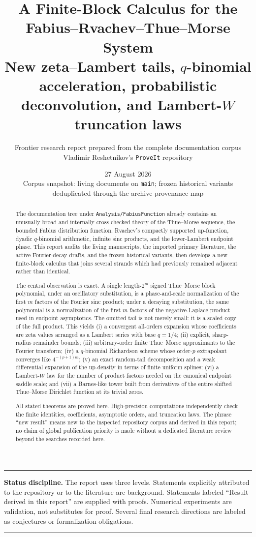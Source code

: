 \documentclass[11pt,oneside]{article}
\title{\bfseries A Finite-Block Calculus for the\\ Fabius--Rvachev--Thue--Morse System\\[0.4em]
\large New zeta--Lambert tails, $q$-binomial acceleration, probabilistic deconvolution, and Lambert-$W$ truncation laws}
\author{Frontier research report prepared from the complete documentation corpus\\
\small Vladimir Reshetnikov's \texttt{ProveIt} repository}
\date{27 August 2026\\
\small Corpus snapshot: living documents on \texttt{main}; frozen historical variants deduplicated through the archive provenance map}
\numberwithin{equation}{section}
\theoremstyle{definition}
\theoremstyle{remark}
\newcommand{\repo}{\nolinkurl{Analysis/FabiusFunction}}
\newenvironment{boxedremark}{%
  \par\smallskip\noindent\begin{center}\begin{minipage}{0.94\textwidth}%
  \color{black}\hrule\vspace{0.6em}\small
}{%
  \vspace{0.6em}\hrule\end{minipage}\end{center}\smallskip
}
\begin{document}
\maketitle

\begin{abstract}
The documentation tree under \repo{} already contains an unusually broad and internally
cross-checked theory of the Thue--Morse sequence, the bounded Fabius distribution function,
Rvachev's compactly supported up-function, dyadic $q$-binomial arithmetic, infinite sinc
products, and the lower-Lambert endpoint phase.  This report audits the living manuscripts,
the imported primary literature, the active Fourier-decay drafts, and the frozen historical
variants, then develops a new finite-block calculus that joins several strands which had
previously remained adjacent rather than identical.

The central observation is exact.  A single length-$2^m$ signed Thue--Morse block polynomial,
under an oscillatory substitution, is a phase-and-scale normalization of the first $m$ factors
of the Fourier sinc product; under a decaying substitution, the same polynomial is a
normalization of the first $m$ factors of the negative-Laplace product used in endpoint
asymptotics.  The omitted tail is not merely small: it is a scaled copy of the full product.
This yields (i) a convergent all-orders expansion whose coefficients are zeta values arranged
as a Lambert series with base $q=1/4$; (ii) explicit, sharp-radius remainder bounds;
(iii) arbitrary-order finite Thue--Morse approximants to the Fourier transform; (iv) a
$q$-binomial Richardson scheme whose order-$p$ extrapolant converges like
$4^{-(p+1)m}$; (v) an exact random-tail decomposition and a weak differential expansion of
the up-density in terms of finite uniform splines; (vi) a Lambert-$W$ law for the number of
product factors needed on the canonical endpoint saddle scale; and (vii) a Barnes-like tower
built from derivatives of the entire shifted Thue--Morse Dirichlet function at its trivial
zeros.

All stated theorems are proved here.  High-precision computations independently check the
finite identities, coefficients, asymptotic orders, and truncation laws.  The phrase
``new result'' means new to the inspected repository corpus and derived in this report; no
claim of global publication priority is made without a dedicated literature review beyond
the searches recorded here.
\end{abstract}

\begin{boxedremark}
\textbf{Status discipline.}
The report uses three levels.  Statements explicitly attributed to the repository or to the
literature are background.  Statements labeled ``Result derived in this report'' are supplied
with proofs.  Numerical experiments are validation, not substitutes for proof.  Several final
research directions are labeled as conjectures or formalization obligations.
\end{boxedremark}
\end{document}
